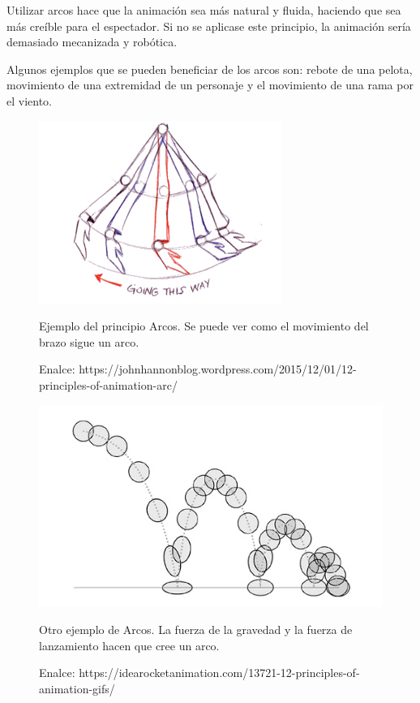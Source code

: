 \documentclass{article}
\begin{document}
\bigskip

Utilizar arcos hace que la animación sea más natural y fluida, haciendo que sea más creíble para el espectador. Si no se aplicase este principio, la animación sería demasiado mecanizada y robótica.

\bigskip

Algunos ejemplos que se pueden beneficiar de los arcos son: rebote de una pelota, movimiento de una extremidad de un personaje y el movimiento de una rama por el viento.

\begin{figure}[H]
    \centering
    \includegraphics[width=\textwidth]{imagenes/arm-arc.jpg}
    \caption{Ejemplo del principio Arcos. Se puede ver como el movimiento del brazo sigue un arco.}
    \caption{Enalce: https://johnhannonblog.wordpress.com/2015/12/01/12-principles-of-animation-arc/}
\end{figure}

\begin{figure}[H]
    \centering
    \includegraphics[width=\textwidth]{imagenes/bouncing-ball.png}
    \caption{Otro ejemplo de Arcos. La fuerza de la gravedad y la fuerza de lanzamiento hacen que cree un arco.}
    \caption{Enalce: https://idearocketanimation.com/13721-12-principles-of-animation-gifs/}
\end{figure}
\end{document}
